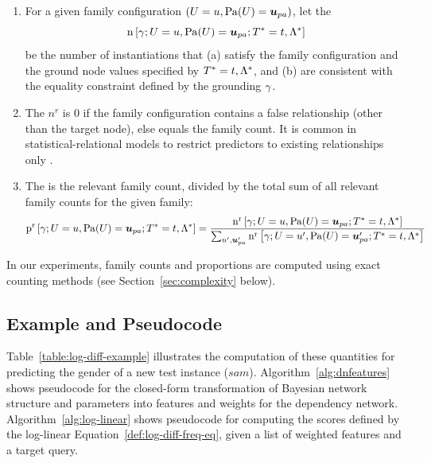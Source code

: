 \documentclass[runningheads,a4paper]{llncs}
\renewcommand{\Qconj}{\Appendterm{\FG{\TT} = \TV} {\QC}} %
\begin{document}
\begin{enumerate}
\item For a given family configuration $(\Appendterm{\UT  = \UV} {\Pa{\UT} = \Prange{\UT}})$, let the  $$\Count{\Appendterm{\grounding;\UT  = \UV} {\Pa{\UT} = \Prange{\UT}}} {\Qconj}$$ be the number of instantiations that (a) satisfy the family configuration and the ground node values specified by $\Qconj$, and (b) are consistent with the equality constraint defined by the grounding $\gamma$.
\item The  $n^{r}$ is 0 if the family configuration contains a false relationship (other than the target node), else equals the family count. It is common in statistical-relational models to restrict predictors to existing relationships only \cite{Getoor2007c,Russell2010}.
\item The  is the relevant family count, divided by the total sum of all relevant family counts for the given family:
{\scriptsize
\begin{equation} \notag
 \Relfreq{\Appendterm{\grounding;\UT  = \UV} {\Pa{\UT} = \Prange{\UT}}} {\Qconj} = \frac{\Relcount{\Appendterm{\grounding;\UT  = \UV} {\Pa{\UT} = \Prange{\UT}}} {\Qconj}}{\sum_{\UV',\Prange{\UT}'}\Relcount{\Appendterm{\grounding;\UT  = \UV'} {\Pa{\UT} = \Prange{\UT}'}} {\Qconj}}
\end{equation}
}
\end{enumerate}

In our experiments, family counts and proportions are computed using exact counting methods (see Section~\ref{sec:complexity} below).


\subsection{Example and Pseudocode}
Table~\ref{table:log-diff-example} illustrates the computation of these quantities for predicting the gender of a new test instance ($sam$). Algorithm~\ref{alg:dnfeatures} shows pseudocode for the closed-form transformation of Bayesian network structure and parameters into features and weights for the dependency network. Algorithm~\ref{alg:log-linear} shows pseudocode for computing the scores defined by the log-linear Equation~\eqref{def:log-diff-freq-eq}, given a list of weighted features and a target query. 
\end{document}
